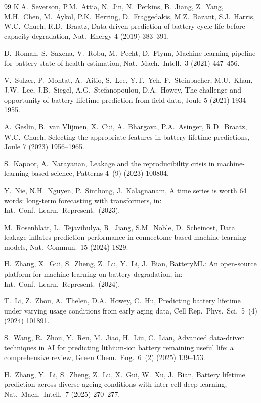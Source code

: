 \begin{thebibliography}{99}
K.A.~Severson, P.M.~Attia, N.~Jin, N.~Perkins, B.~Jiang, Z.~Yang, M.H.~Chen, M.~Aykol, P.K.~Herring, D.~Fraggedakis, M.Z.~Bazant, S.J.~Harris, W.C.~Chueh, R.D.~Braatz,
Data-driven prediction of battery cycle life before capacity degradation,
Nat.\ Energy 4 (2019) 383--391.

D.~Roman, S.~Saxena, V.~Robu, M.~Pecht, D.~Flynn,
Machine learning pipeline for battery state-of-health estimation,
Nat.\ Mach.\ Intell.\ 3 (2021) 447--456.

V.~Sulzer, P.~Mohtat, A.~Aitio, S.~Lee, Y.T.~Yeh, F.~Steinbacher, M.U.~Khan, J.W.~Lee, J.B.~Siegel, A.G.~Stefanopoulou, D.A.~Howey,
The challenge and opportunity of battery lifetime prediction from field data,
Joule 5 (2021) 1934--1955.

A.~Geslin, B.~van Vlijmen, X.~Cui, A.~Bhargava, P.A.~Asinger, R.D.~Braatz, W.C.~Chueh,
Selecting the appropriate features in battery lifetime predictions,
Joule 7 (2023) 1956--1965.

S.~Kapoor, A.~Narayanan,
Leakage and the reproducibility crisis in machine-learning-based science,
Patterns 4~(9) (2023) 100804.

Y.~Nie, N.H.~Nguyen, P.~Sinthong, J.~Kalagnanam,
A time series is worth 64 words: long-term forecasting with transformers,
in: Int.\ Conf.\ Learn.\ Represent.\ (2023).

M.~Rosenblatt, L.~Tejavibulya, R.~Jiang, S.M.~Noble, D.~Scheinost,
Data leakage inflates prediction performance in connectome-based machine learning models,
Nat.\ Commun.\ 15 (2024) 1829.

H.~Zhang, X.~Gui, S.~Zheng, Z.~Lu, Y.~Li, J.~Bian,
BatteryML: An open-source platform for machine learning on battery degradation,
in: Int.\ Conf.\ Learn.\ Represent.\ (2024).

T.~Li, Z.~Zhou, A.~Thelen, D.A.~Howey, C.~Hu,
Predicting battery lifetime under varying usage conditions from early aging data,
Cell Rep.\ Phys.\ Sci.\ 5~(4) (2024) 101891.

S.~Wang, R.~Zhou, Y.~Ren, M.~Jiao, H.~Liu, C.~Lian,
Advanced data-driven techniques in AI for predicting lithium-ion battery remaining useful life: a comprehensive review,
Green Chem.\ Eng.\ 6~(2) (2025) 139--153.

H.~Zhang, Y.~Li, S.~Zheng, Z.~Lu, X.~Gui, W.~Xu, J.~Bian,
Battery lifetime prediction across diverse ageing conditions with inter-cell deep learning,
Nat.\ Mach.\ Intell.\ 7 (2025) 270--277.


\end{thebibliography}
